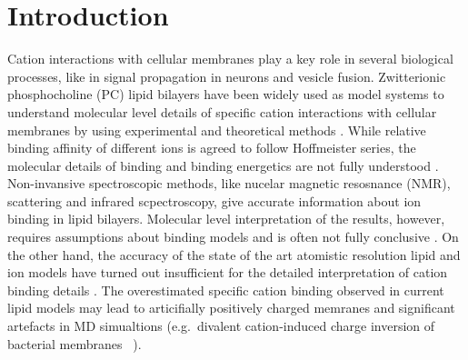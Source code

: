\documentclass[aip,jcp,twocolumn]{revtex4}
\begin{document}
\section{Introduction}
Cation interactions with cellular membranes play a key role in several biological processes,
like in signal propagation in neurons and vesicle fusion.
Zwitterionic phosphocholine (PC) lipid bilayers have been widely used as model systems
to understand molecular level details of specific cation interactions with
cellular membranes by using experimental \cite{cevc90,tocanne90,binder02,pabst07,uhrikova08}
and theoretical methods \cite{bockmann03,bockmann04,Berkowitz12,??} 
.
While relative binding affinity of different ions is agreed to follow Hoffmeister
series, the molecular details of binding and binding energetics are
not fully understood \cite{cevc90,tocanne90,seelig90,binder02,catte16,??}.
Non-invansive spectroscopic methods, like nucelar magnetic resosnance (NMR), scattering
and infrared scpectroscopy, give accurate information about ion binding
in lipid bilayers\cite{hauser76,hauser78,herbette84,akutsu81,altenbach84,binder02}. 
Molecular level interpretation of the results, however, requires assumptions
about binding models and is often not fully conclusive \cite{??}.
On the other hand, the accuracy of the state of the art atomistic resolution lipid and ion models
have turned out insufficient for the detailed interpretation of cation binding details \cite{catte16}.
The overestimated specific cation binding observed in current lipid models \cite{catte16}
may lead to articifially positively charged memranes and significant artefacts in
MD simualtions (e.g.~divalent cation-induced charge inversion of bacterial membranes~\cite{Luan2016} ). 

\end{document}
